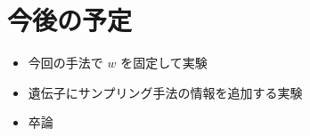 \documentclass[twocolumn]{jarticle}     %
\begin{document}


\section{今後の予定}
\begin{itemize}
  \item 今回の手法で $w$ を固定して実験
  \item 遺伝子にサンプリング手法の情報を追加する実験
  \item 卒論

\end{itemize}



\end{document}
